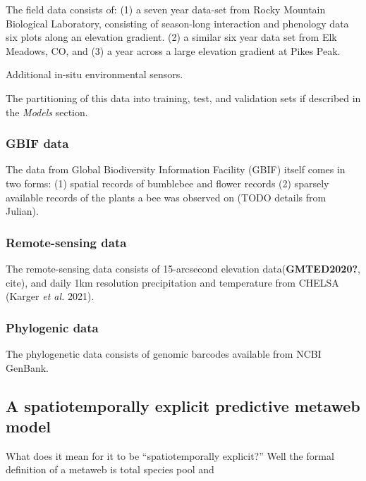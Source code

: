 \documentclass[10pt,oneside]{article}
\begin{document}
The field data consists of: (1) a seven year data-set from Rocky
Mountain Biological Laboratory, consisting of season-long interaction
and phenology data six plots along an elevation gradient. (2) a similar
six year data set from Elk Meadows, CO, and (3) a year across a large
elevation gradient at Pikes Peak.

Additional in-situ environmental sensors.

The partitioning of this data into training, test, and validation sets
if described in the \emph{Models} section.

\hypertarget{gbif-data}{%
\subsubsection{GBIF data}\label{gbif-data}}

The data from Global Biodiversity Information Facility (GBIF) itself
comes in two forms: (1) spatial records of bumblebee and flower records
(2) sparsely available records of the plants a bee was observed on (TODO
details from Julian).

\hypertarget{remote-sensing-data}{%
\subsubsection{Remote-sensing data}\label{remote-sensing-data}}

The remote-sensing data consists of 15-arcsecond elevation
data(\textbf{GMTED2020?}, cite), and daily 1km resolution precipitation
and temperature from CHELSA (Karger \emph{et al.} 2021).

\hypertarget{phylogenic-data}{%
\subsubsection{Phylogenic data}\label{phylogenic-data}}

The phylogenetic data consists of genomic barcodes available from NCBI
GenBank.

\hypertarget{a-spatiotemporally-explicit-predictive-metaweb-model}{%
\subsection{A spatiotemporally explicit predictive metaweb
model}\label{a-spatiotemporally-explicit-predictive-metaweb-model}}

What does it mean for it to be ``spatiotemporally explicit?'' Well the
formal definition of a metaweb is total species pool and
\end{document}
